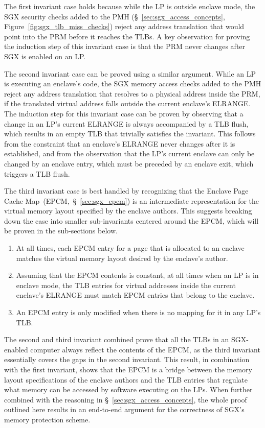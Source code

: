 The first invariant case holds because while the LP is outside enclave mode,
the SGX security checks added to the PMH (\S~\ref{sec:sgx_access_concepts},
Figure~\ref{fig:sgx_tlb_miss_checks}) reject any address translation that would
point into the PRM before it reaches the TLBs. A key observation for proving
the induction step of this invariant case is that the PRM never changes after
SGX is enabled on an LP.

The second invariant case can be proved using a similar argument. While an LP
is executing an enclave's code, the SGX memory access checks added to the PMH
reject any address translation that resolves to a physical address inside the
PRM, if the translated virtual address falls outside the current enclave's
ELRANGE. The induction step for this invariant case can be proven by observing
that a change in an LP's current ELRANGE is always accompanied by a TLB flush,
which results in an empty TLB that trivially satisfies the invariant. This
follows from the constraint that an enclave's ELRANGE never changes after it is
established, and from the observation that the LP's current enclave can only be
changed by an enclave entry, which must be preceded by an enclave exit, which
triggers a TLB flush.

The third invariant case is best handled by recognizing that the Enclave Page
Cache Map~(EPCM,~\S~\ref{sec:sgx_epcm}) is an intermediate representation for
the virtual memory layout specified by the enclave authors. This suggests
breaking down the case into smaller sub-invariants centered around the EPCM,
which will be proven in the sub-sections below.

\begin{enumerate}
\item At all times, each EPCM entry for a page that is allocated to an enclave
  matches the virtual memory layout desired by the enclave's author.
\item Assuming that the EPCM contents is constant, at all times when an LP is
  in enclave mode, the TLB entries for virtual addresses inside the current
  enclave's ELRANGE must match EPCM entries that belong to the enclave.
\item An EPCM entry is only modified when there is no mapping for it in any
  LP's TLB.
\end{enumerate}

The second and third invariant combined prove that all the TLBs in an
SGX-enabled computer always reflect the contents of the EPCM, as the third
invariant essentially covers the gaps in the second invariant. This result, in
combination with the first invariant, shows that the EPCM is a bridge between
the memory layout specifications of the enclave authors and the TLB entries
that regulate what memory can be accessed by software executing on the LPs.
When further combined with the reasoning in \S~\ref{sec:sgx_access_concepts},
the whole proof outlined here results in an end-to-end argument for the
correctness of SGX's memory protection scheme.


